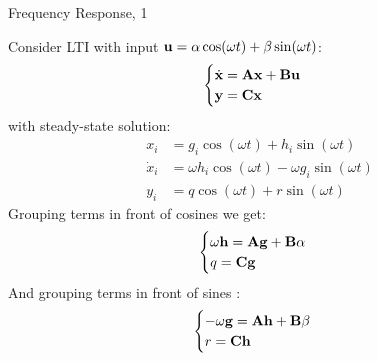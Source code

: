 \documentclass{beamer}
\begin{document}
\begin{frame}{Frequency Response, 1}
	\begin{flushleft}
		
		Consider LTI with input $\mathbf{u} = \alpha \cos(\omega t) + \beta \sin (\omega t)$:
		\begin{equation}
			\begin{cases}
				\dot{\mathbf{x}} = \mathbf{A}\mathbf{x} + \mathbf{B}\mathbf{u}
				\\
				\mathbf{y} = \mathbf{C}\mathbf{x}
			\end{cases}
		\end{equation}
		with steady-state solution:
		\begin{align}
			x_i &= g_i \cos(\omega t) + h_i \sin (\omega t)
			\\
			\dot x_i &=\omega h_i \cos(\omega t) - \omega g_i \sin (\omega t)
			\\
			y_i &= q \cos(\omega t) + r \sin (\omega t)
		\end{align}
		Grouping terms in front of cosines we get:
		\begin{align}
			\begin{cases}
				\omega \mathbf{h} = \mathbf{A} \mathbf{g} + \mathbf{B} \alpha
				\\
				q = \mathbf{C} \mathbf{g}
			\end{cases}
		\end{align}
		And grouping terms in front of sines :
		\begin{align}
			\begin{cases}
				-\omega \mathbf{g} = \mathbf{A} \mathbf{h} + \mathbf{B} \beta
				\\
				r = \mathbf{C} \mathbf{h}
			\end{cases}
		\end{align}
		
		
	\end{flushleft}
\end{frame}
\end{document}
